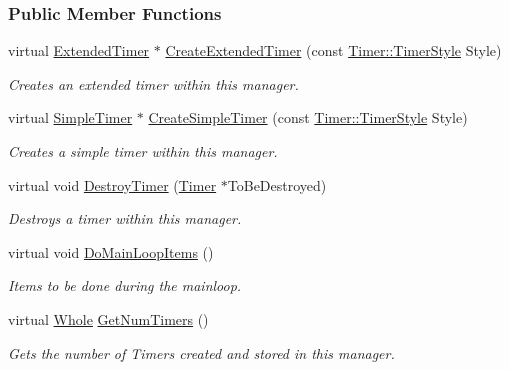 \subsubsection*{Public Member Functions}
\begin{DoxyCompactItemize}
\item 
virtual \hyperlink{classMezzanine_1_1ExtendedTimer}{ExtendedTimer} $\ast$ \hyperlink{classMezzanine_1_1TimerManager_a2f96dc0fdc223b2c78f18f515bca2c34}{CreateExtendedTimer} (const \hyperlink{classMezzanine_1_1Timer_a1db436d4e0d6f1676e41ba3cb2ea3aaa}{Timer::TimerStyle} Style)
\begin{DoxyCompactList}\small\item\em Creates an extended timer within this manager. \item\end{DoxyCompactList}\item 
virtual \hyperlink{classMezzanine_1_1SimpleTimer}{SimpleTimer} $\ast$ \hyperlink{classMezzanine_1_1TimerManager_abe68dba04eac77cb8a2a333aea26bb4c}{CreateSimpleTimer} (const \hyperlink{classMezzanine_1_1Timer_a1db436d4e0d6f1676e41ba3cb2ea3aaa}{Timer::TimerStyle} Style)
\begin{DoxyCompactList}\small\item\em Creates a simple timer within this manager. \item\end{DoxyCompactList}\item 
virtual void \hyperlink{classMezzanine_1_1TimerManager_a7ac6225d3e7fd72d53cf213464bded6e}{DestroyTimer} (\hyperlink{classMezzanine_1_1Timer}{Timer} $\ast$ToBeDestroyed)
\begin{DoxyCompactList}\small\item\em Destroys a timer within this manager. \item\end{DoxyCompactList}\item 
virtual void \hyperlink{classMezzanine_1_1TimerManager_a6ac7544b79fb023e4596e350a5586f85}{DoMainLoopItems} ()
\begin{DoxyCompactList}\small\item\em Items to be done during the mainloop. \item\end{DoxyCompactList}\item 
virtual \hyperlink{namespaceMezzanine_adcbb6ce6d1eb4379d109e51171e2e493}{Whole} \hyperlink{classMezzanine_1_1TimerManager_a683dcef5328ff001adb1f3fc40fd6132}{GetNumTimers} ()
\begin{DoxyCompactList}\small\item\em Gets the number of Timers created and stored in this manager. \item\end{DoxyCompactList}\item 

\end{DoxyCompactItemize}
